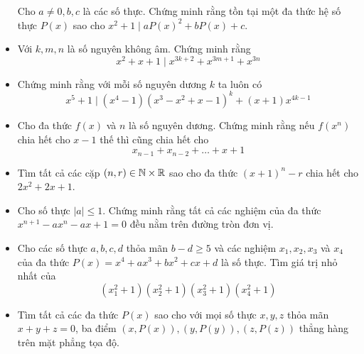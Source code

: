 \documentclass[11pt]{scrartcl}
\begin{document}
\begin{itemize}[label=, leftmargin=0em, itemsep=0.5em]
\begin{btvn}
            Cho $a \neq 0,b,c$ là các số thực. Chứng minh rằng tồn tại một đa thức hệ số thực $P(x)$ sao cho $x^2 + 1 \mid aP(x)^2 + bP(x) + c$.
        \end{btvn}
        \item \begin{btvn}
            Với $k,m,n$ là số nguyên không âm. Chứng minh rằng
            \[
                x^2 + x + 1 \mid x^{3k + 2} + x^{3m + 1} + x^{3n}
            \]
        \end{btvn}
        \item \begin{btvn}
            Chứng minh rằng với mỗi số nguyên dương $k$ ta luôn có
            \[
                x^5 + 1 \mid (x^4 - 1)(x^3 - x^2 + x - 1)^k + (x + 1)x^{4k - 1}
            \]
        \end{btvn}
        \item \begin{btvn}
            Cho đa thức $f(x)$ và $n$ là số nguyên dương. Chứng minh rằng nếu $f(x^n)$ chia hết cho $x - 1$ thế thì cũng chia hết cho
            \[
                x_{n - 1} + x_{n - 2} +\dots + x + 1
            \]
        \end{btvn}
        \item \begin{btvn}
            Tìm tất cả các cặp $(n,r) \in \mathbb{N} \times \mathbb{R}$ sao cho đa thức $(x + 1)^n - r$ chia hết cho $2x^2 + 2x + 1$.
        \end{btvn}
        \item \begin{btvn}
            Cho số thực $|a| \leq 1$. Chứng minh rằng tất cả các nghiệm của đa thức $x^{n + 1} -ax^n -ax + 1 = 0$ đều nằm trên đường tròn đơn vị.
        \end{btvn}
        \item \begin{btvn}
            Cho các số thực $a,b,c,d$ thỏa mãn $b - d \geq 5$ và các nghiệm $x_1,x_2,x_3$ và $x_4$ của đa thức $P(x) = x^4 +ax^3 + bx^2 + cx + d$ là số thực. Tìm giá trị nhỏ nhất của
            \[
                (x_1^2 + 1)(x_2^2 + 1)(x_3^2 + 1)(x_4^2 + 1)
            \]
        \end{btvn}
        \item \begin{btvn}
            Tìm tất cả các đa thức $P(x)$ sao cho với mọi số thực $x,y,z$ thỏa mãn $x + y + z = 0$, ba điểm $(x,P(x)), (y,P(y)),(z,P(z))$ thẳng hàng trên mặt phẳng tọa độ.
        \end{btvn}


\end{itemize}
\end{document}
